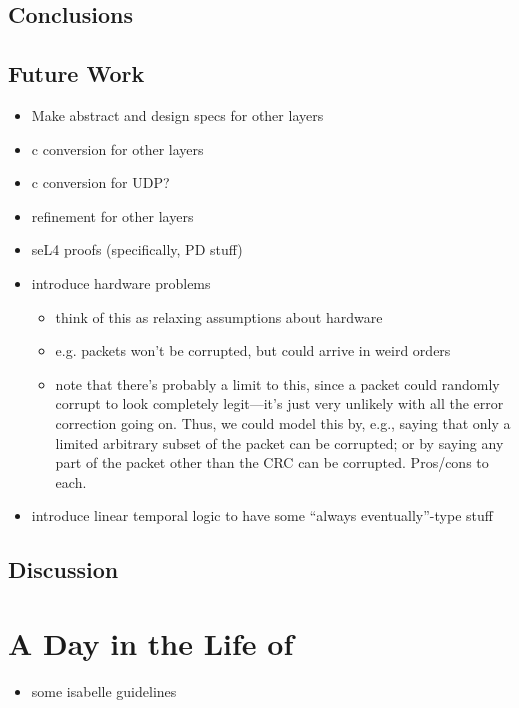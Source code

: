 \documentclass[twoside]{memoir}
\begin{document}
\section{Conclusions}
\section{Future Work}
\begin{itemize}
    \item Make abstract and design specs for other layers
    \item c conversion for other layers
    \item c conversion for UDP?
    \item refinement for other layers
    \item seL4 proofs (specifically, PD stuff)
    \item introduce hardware problems
        \begin{itemize}
            \item think of this as relaxing assumptions about hardware
            \item e.g. packets won't be corrupted, but could arrive in weird orders
            \item note that there's probably a limit to this,
                since a packet could randomly corrupt to
                look completely legit---it's just very
                unlikely with all the error correction
                going on.
                Thus, we could model this by, e.g.,
                saying that only a limited arbitrary subset
                of the packet can be corrupted;
                or by saying any part of the packet other
                than the CRC can be corrupted.
                Pros/cons to each.
        \end{itemize}
    \item introduce linear temporal logic to have some ``always eventually''-type stuff
\end{itemize}
\section{Discussion}

\chapter{A Day in the Life of}
\begin{itemize}
    \item some isabelle guidelines
\end{itemize}
\end{document}
